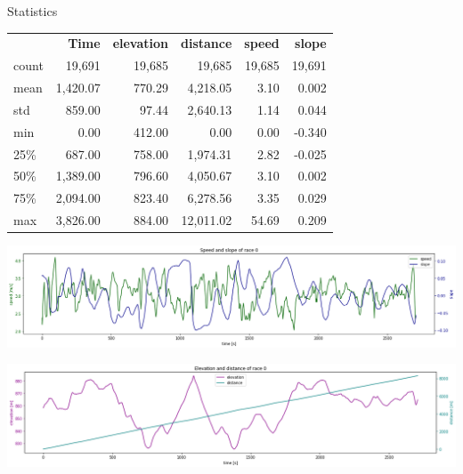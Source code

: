 \documentclass[aspectratio=169]{beamer}
\begin{document}
\begin{frame}{Statistics}
  \begin{table}[h]
    \begin{center}
      \begin{tabular}{|l||r|r|r|r|r|}
      \hhline{~-----}
      \multicolumn{1}{l|}{} & \textbf{Time} & \textbf{elevation} & \textbf{distance} & \textbf{speed} & \textbf{slope}\\
      \hhline{-=====}
      count & 19,691 & 19,685 & 19,685 & 19,685 & 19,691\\
      mean & 1,420.07 & 770.29 & 4,218.05 & 3.10 & 0.002\\
      std & 859.00 & 97.44 & 2,640.13 & 1.14 & 0.044\\
      min & 0.00 & 412.00 & 0.00 & 0.00 & -0.340\\
      25\% & 687.00 & 758.00 & 1,974.31 & 2.82 & -0.025\\
      50\% & 1,389.00 & 796.60 & 4,050.67 & 3.10 & 0.002\\
      75\% & 2,094.00 & 823.40 & 6,278.56 & 3.35 & 0.029\\
      max & 3,826.00 & 884.00 & 12,011.02 & 54.69 & 0.209\\
      \hline
      \end{tabular}
    \end{center}
    \label{tbl:stats-dataset}
  \end{table}
\end{frame}


\begin{frame}
  \begin{center}
    \includegraphics[width=\textwidth]{03_plot_speed_slope.png}
  \end{center}
\end{frame}


\begin{frame}
  \begin{center}
    \includegraphics[width=\textwidth]{04_plot_elevation_distance.png}
  \end{center}
\end{frame}
\end{document}
